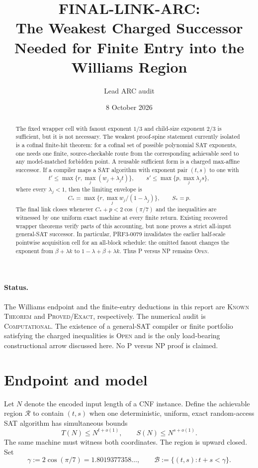 \documentclass[11pt]{article}
\title{FINAL-LINK-ARC:\\The Weakest Charged Successor Needed for Finite Entry into the Williams Region}
\author{Lead ARC audit}
\date{8 October 2026}
\newcommand{\R}{\mathcal R}
\newcommand{\B}{\mathcal B}
\begin{document}
\maketitle

\begin{abstract}
The fixed wrapper cell with fanout exponent $1/3$ and child-size exponent
$2/3$ is sufficient, but it is not necessary.  The weakest proof-spine
statement currently isolated is a cofinal finite-hit theorem: for a cofinal
set of possible polynomial SAT exponents, one needs one finite,
source-checkable route from the corresponding achievable seed to any
model-matched forbidden point.  A reusable sufficient form is a charged
max-affine successor.  If a compiler maps a SAT algorithm with exponent pair
$(t,s)$ to one with
\[
 t'\leq \max\{r,\max_j(w_j+\lambda_jt)\},\qquad
 s'\leq \max\{p,\max_j\lambda_js\},
\]
where every $\lambda_j<1$, then the limiting envelope is
\[
 C_* = \max\{r,\max_j w_j/(1-\lambda_j)\},\qquad S_*=p.
\]
The final link closes whenever $C_*+p<2\cos(\pi/7)$ and the inequalities are
witnessed by one uniform exact machine at every finite return.  Existing
recovered wrapper theorems verify parts of this accounting, but none proves a
strict all-input general-SAT successor.  In particular, PRF3-0079 invalidates
the earlier half-scale pointwise acquisition cell for an all-block schedule:
the omitted fanout changes the exponent from $\beta+\lambda k$ to
$1-\lambda+\beta+\lambda k$.  Thus P versus NP remains \textsc{Open}.
\end{abstract}

\paragraph{Status.}
The Williams endpoint and the finite-entry deductions in this report are
\textsc{Known Theorem} and \textsc{Proved/Exact}, respectively.  The numerical
audit is \textsc{Computational}.  The existence of a general-SAT compiler or
finite portfolio satisfying the charged inequalities is \textsc{Open} and is
the only load-bearing constructional arrow discussed here.  No P versus NP
proof is claimed.

\section{Endpoint and model}

Let $N$ denote the encoded input length of a CNF instance.  Define the
achievable region $\R$ to contain $(t,s)$ when one deterministic, uniform,
exact random-access SAT algorithm has simultaneous bounds
\[
 T(N)\leq N^{t+o(1)},\qquad S(N)\leq N^{s+o(1)}.
\]
The same machine must witness both coordinates.  The region is upward closed.
Set
\[
 \gamma:=2\cos(\pi/7)=1.8019377358\ldots,
 \qquad
 \B:=\{(t,s):t+s<\gamma\}.
\]
\end{document}
